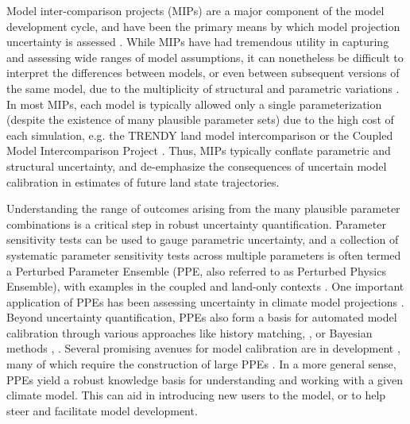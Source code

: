 \documentclass[draft]{agujournal2019}
\begin{document}
Model inter-comparison projects (MIPs) are a major component of the model development cycle, and have been the primary means by which model projection uncertainty is assessed \cite{henderson-sellers1995,pitman1999,wood1998,schlosser2000,eyring2016,friedlingstein2022}. While MIPs have had tremendous utility in capturing and assessing wide ranges of model assumptions, it can nonetheless be difficult to interpret the differences between models, or even between subsequent versions of the same model, due to the multiplicity of structural and parametric variations \cite{mcneall2016}. In most MIPs, each model is typically allowed only a single parameterization (despite the existence of many plausible parameter sets) due to the high cost of each simulation, e.g. the TRENDY land model intercomparison \cite{sitch2024} or the Coupled Model Intercomparison Project \cite{eyring2016}. Thus, MIPs typically conflate parametric and structural uncertainty, and de-emphasize the consequences of uncertain model calibration in estimates of future land state trajectories. 

Understanding the range of outcomes arising from the many plausible parameter combinations is a critical step in robust uncertainty quantification. Parameter sensitivity tests can be used to gauge parametric uncertainty, and a collection of systematic parameter sensitivity tests across multiple parameters is often termed a Perturbed Parameter Ensemble (PPE, also referred to as Perturbed Physics Ensemble), with examples in the coupled \cite{murphy2004} and land-only contexts  \cite{dagon2020,mcneall2024}. 
One important application of PPEs has been assessing uncertainty in climate model projections \cite{murphy2004,sanderson2008,booth2012,hawkins2019,yamazaki2021,peatier2022,tett2022}.
Beyond uncertainty quantification, PPEs also form a basis for automated model calibration through various approaches like history matching,  \cite{williamson2013,williamson2017,hourdin2020,couvreux2021,mcneall2024}, or Bayesian methods  \cite{cleary2021}, .
Several promising avenues for model calibration are in development \cite{pinnington2020,cleary2021,alonso-gonzalez2022}, many of which require the construction of large PPEs \cite{qian2018}.
In a more general sense, PPEs yield a robust knowledge basis for understanding and working with a given climate model. This can aid in introducing new users to the model, or to help steer and facilitate model development.
\end{document}
